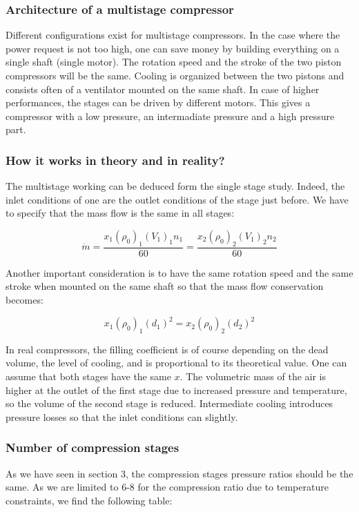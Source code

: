 \subsubsection{Architecture of a multistage compressor} 

Different configurations exist for multistage compressors. In the case where the power request is not too high, one can save money by building everything on a single shaft (single motor). The rotation speed and the stroke of the two piston compressors will be the same. Cooling is organized between the two pistons and consists often of a ventilator mounted on the same shaft. In case of higher performances, the stages can be driven by different motors. This gives a compressor with a low pressure, an intermadiate pressure and a high pressure part. 

\subsubsection{How it works in theory and in reality?} 
The multistage working can be deduced form the single stage study. Indeed, the inlet conditions of one are the outlet conditions of the stage just before. We have to specify that the mass flow is the same in all stages: 

\begin{equation}
\dot{m} = \frac{x_1 (\rho _0)_1(V_1)_1n_1}{60} = \frac{x_2 (\rho _0)_2(V_1)_2n_2}{60}
\end{equation}

Another important consideration is to have the same rotation speed and the same stroke when mounted on the same shaft so that the mass flow conservation becomes: 

\begin{equation}
x_1 (\rho _0)_1 (d_1)^2 = x_2 (\rho _0)_2 (d_2)^2
\end{equation}

In real compressors, the filling coefficient is of course depending on the dead volume, the level of cooling, and is proportional to its theoretical value. One can assume that both stages have the same $x$. The volumetric mass of the air is higher at the outlet of the first stage due to increased pressure and temperature, so the volume of the second stage is reduced. Intermediate cooling introduces pressure losses so that the inlet conditions can slightly. 

\subsubsection{Number of compression stages}
As we have seen in section 3, the compression stages pressure ratios should be the same. As we are limited to 6-8 for the compression ratio due to temperature constraints, we find the following table: 

